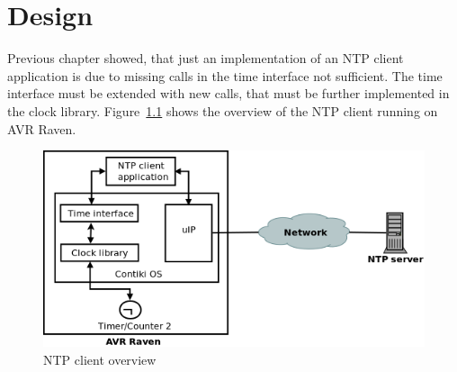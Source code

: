 
\chapter{Design}
Previous chapter showed, that just an implementation of an
NTP client application is due to missing calls in the time interface not sufficient.
The time interface must be extended with new calls,
that must be further implemented in the clock library.
Figure~\ref{fig:design-overview} shows the overview of the NTP client running on AVR Raven.

\begin{figure}[H]
  \centering
  \includegraphics[width=13cm,keepaspectratio]{fig/design.png}
  \caption{NTP client overview} %
  \label{fig:design-overview} %
\end{figure}





%


%
